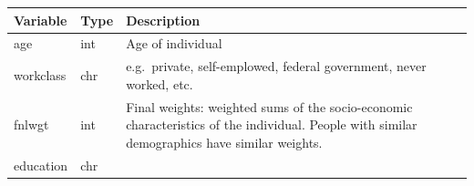 \documentclass[]{article}
\begin{document}
\begin{longtable}[]{@{}lll@{}}
\toprule
\begin{minipage}[b]{0.35\columnwidth}\raggedright
Variable\strut
\end{minipage} & \begin{minipage}[b]{0.30\columnwidth}\raggedright
Type\strut
\end{minipage} & \begin{minipage}[b]{0.26\columnwidth}\raggedright
Description\strut
\end{minipage}\tabularnewline
\midrule
\endhead
\begin{minipage}[t]{0.35\columnwidth}\raggedright
age\strut
\end{minipage} & \begin{minipage}[t]{0.30\columnwidth}\raggedright
int\strut
\end{minipage} & \begin{minipage}[t]{0.26\columnwidth}\raggedright
Age of individual\strut
\end{minipage}\tabularnewline
\begin{minipage}[t]{0.35\columnwidth}\raggedright
workclass\strut
\end{minipage} & \begin{minipage}[t]{0.30\columnwidth}\raggedright
chr\strut
\end{minipage} & \begin{minipage}[t]{0.26\columnwidth}\raggedright
e.g.~private, self-emplowed, federal government, never worked,
etc.\strut
\end{minipage}\tabularnewline
\begin{minipage}[t]{0.35\columnwidth}\raggedright
fnlwgt\strut
\end{minipage} & \begin{minipage}[t]{0.30\columnwidth}\raggedright
int\strut
\end{minipage} & \begin{minipage}[t]{0.26\columnwidth}\raggedright
Final weights: weighted sums of the socio-economic characteristics of
the individual. People with similar demographics have similar
weights.\strut
\end{minipage}\tabularnewline
\begin{minipage}[t]{0.35\columnwidth}\raggedright
education\strut
\end{minipage} & \begin{minipage}[t]{0.30\columnwidth}\raggedright
chr\strut
\end{minipage} & \begin{minipage}[t]{0.26\columnwidth}\raggedright

\end{minipage}
\end{longtable}
\end{document}
